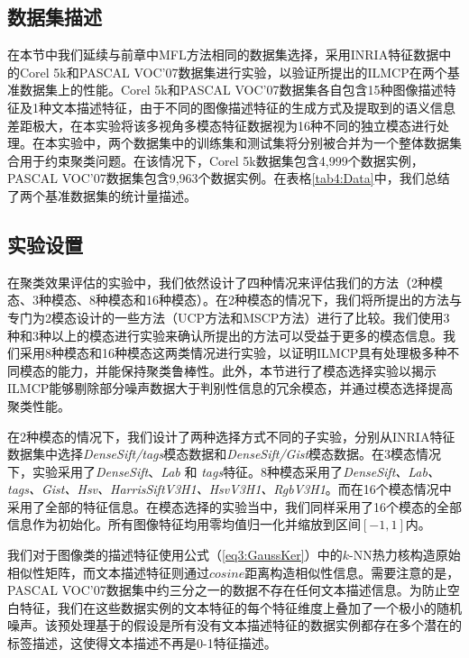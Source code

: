 \subsection{数据集描述}
在本节中我们延续与前章中MFL方法相同的数据集选择，采用INRIA特征数据\cite{guillaumin2009tagprop}中的Corel 5k和PASCAL VOC'07数据集进行实验，以验证所提出的ILMCP在两个基准数据集上的性能。Corel 5k和PASCAL VOC'07数据集各自包含15种图像描述特征及1种文本描述特征，由于不同的图像描述特征的生成方式及提取到的语义信息差距极大，在本实验将该多视角多模态特征数据视为16种不同的独立模态进行处理。在本实验中，两个数据集中的训练集和测试集将分别被合并为一个整体数据集合用于约束聚类问题。在该情况下，Corel 5k数据集包含4,999个数据实例，PASCAL VOC'07数据集包含9,963个数据实例。在表格\ref{tab4:Data}中，我们总结了两个基准数据集的统计量描述。

\subsection{实验设置}

在聚类效果评估的实验中，我们依然设计了四种情况来评估我们的方法（2种模态、3种模态、8种模态和16种模态）。在2种模态的情况下，我们将所提出的方法与专门为2模态设计的一些方法（UCP方法和MSCP方法）进行了比较。我们使用3种和3种以上的模态进行实验来确认所提出的方法可以受益于更多的模态信息。我们采用8种模态和16种模态这两类情况进行实验，以证明ILMCP具有处理极多种不同模态的能力，并能保持聚类鲁棒性。此外，本节进行了模态选择实验以揭示ILMCP能够剔除部分噪声数据大于判别性信息的冗余模态，并通过模态选择提高聚类性能。

在2种模态的情况下，我们设计了两种选择方式不同的子实验，分别从INRIA特征数据集中选择\textit{DenseSift/tags}模态数据和\textit{DenseSift/Gist}模态数据。在3模态情况下，实验采用了\textit{DenseSift}、\textit{Lab} 和 \textit{tags}特征。8种模态采用了\textit{DenseSift、Lab、tags、Gist、Hsv、HarrisSiftV3H1、HsvV3H1、RgbV3H1}。而在16个模态情况中采用了全部的特征信息。在模态选择的实验当中，我们同样采用了16个模态的全部信息作为初始化。所有图像特征均用零均值归一化并缩放到区间$[-1,1] $内。

我们对于图像类的描述特征使用公式（\ref{eq3:GaussKer}）中的$k$-NN热力核构造原始相似性矩阵，而文本描述特征则通过$cosine$距离构造相似性信息。需要注意的是，PASCAL VOC'07数据集中约三分之一的数据不存在任何文本描述信息。为防止空白特征，我们在这些数据实例的文本特征的每个特征维度上叠加了一个极小的随机噪声。该预处理基于的假设是所有没有文本描述特征的数据实例都存在多个潜在的标签描述，这使得文本描述不再是0-1特征描述。


